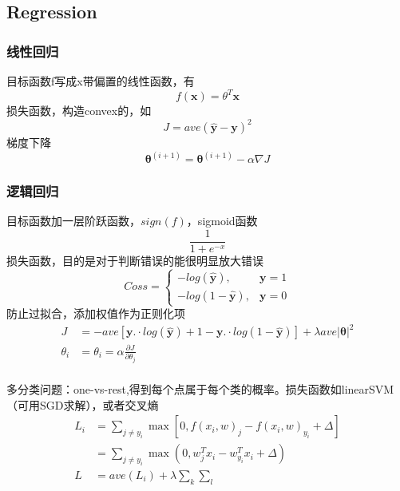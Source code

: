 \documentclass[UTF8]{article}
\begin{document}
\subsection{Regression}
\subsubsection{线性回归}
目标函数f写成x带偏置的线性函数，有
\begin{equation}
f(\mathbf x)=\theta ^T \mathbf x
\end{equation}
损失函数，构造convex的，如
\begin{equation}
J= ave (\hat {\mathbf y}-\mathbf y)^2
\end{equation}
梯度下降
\begin{equation}
\mathbf \theta ^{(i+1)}=\mathbf \theta ^{(i+1)}-\alpha \nabla J
\end{equation}
 
\subsubsection{逻辑回归}
目标函数加一层阶跃函数，$sign(f)$，sigmoid函数
\begin{equation}
\frac{1}{1+e^{-x}}
\end{equation}
 损失函数，目的是对于判断错误的能很明显放大错误
\begin{equation}
Coss= \left\{
    \begin{aligned}
    -log(\hat {\mathbf y}),&\mathbf y=1\\
    -log(1-\hat {\mathbf y}),&\mathbf y=0
    \end{aligned}
    \right.
\end{equation}
防止过拟合，添加权值作为正则化项
\begin{equation}
    \begin{split}
    J&=-ave \left[
    {\mathbf y}.\cdot log(\hat {\mathbf y})
    +{1-\mathbf y}.\cdot log(1-\hat {\mathbf y})
\right]+\lambda ave|\mathbf \theta   |^2\\
        \theta_i&=\theta_i =\alpha \frac{\partial J}{\partial \theta_j}\\
    \end{split}
\end{equation}
 
多分类问题：one-vs-rest,得到每个点属于每个类的概率。损失函数如linearSVM（可用SGD求解），或者交叉熵
\begin{equation}
\label{hinge loss}
\begin{split}
    L_i & = \sum_{j\neq y_i} \max \left[ 0,f(x_i,w)_j-f(x_i,w)_{y_i}+\Delta  \right]\\
    &=\sum_{j \neq y_i} \max \left( 0,w_j^Tx_i-w_{y_i}^Tx_i +\Delta \right)\\
    L& = ave(L_i)+\lambda\sum_k \sum_l
\end{split}
\end{equation}
\end{document}
